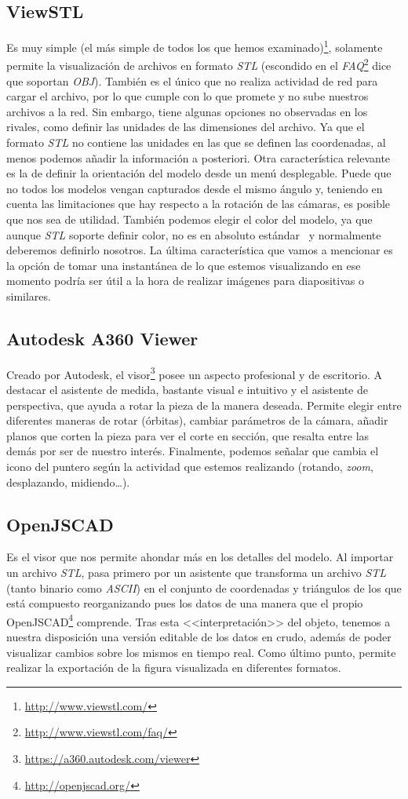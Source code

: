 \subsection{ViewSTL}
Es muy simple (el más simple de todos los que hemos examinado)\footnote{\url{http://www.viewstl.com/}}, solamente permite la visualización de archivos en formato \textit{STL} (escondido en el \textit{FAQ}\footnote{\url{http://www.viewstl.com/faq/}} dice que soportan \textit{OBJ}). También es el único que no realiza actividad de red para cargar el archivo, por lo que cumple con lo que promete y no sube nuestros archivos a la red.
Sin embargo, tiene algunas opciones no observadas en los rivales, como definir las unidades de las dimensiones del archivo. Ya que el formato \textit{STL} no contiene las unidades en las que se definen las coordenadas, al menos podemos añadir la información a posteriori.
Otra característica relevante es la de definir la orientación del modelo desde un menú desplegable. Puede que no todos los modelos vengan capturados desde el mismo ángulo y, teniendo en cuenta las limitaciones que hay respecto a la rotación de las cámaras, es posible que nos sea de utilidad.
También podemos elegir el color del modelo, ya que aunque \textit{STL} soporte definir color, no es en absoluto estándar~\cite{wiki:color-in-STL} y normalmente deberemos definirlo nosotros.
La última característica que vamos a mencionar es la opción de tomar una instantánea de lo que estemos visualizando en ese momento podría ser útil a la hora de realizar imágenes para diapositivas o similares.

\subsection{Autodesk A360 Viewer}
Creado por Autodesk, el visor\footnote{\url{https://a360.autodesk.com/viewer}} posee un aspecto profesional y de escritorio.
A destacar el asistente de medida, bastante visual e intuitivo y el asistente de perspectiva, que ayuda a rotar la pieza de la manera deseada.
Permite elegir entre diferentes maneras de rotar (órbitas), cambiar parámetros de la cámara, añadir planos que corten la pieza para ver el corte en sección, que resalta entre las demás por ser de nuestro interés.
Finalmente, podemos señalar que cambia el icono del puntero según la actividad que estemos realizando (rotando, \textit{zoom}, desplazando, midiendo\dots).

\subsection{OpenJSCAD}
Es el visor que nos permite ahondar más en los detalles del modelo. Al importar un archivo \textit{STL}, pasa primero por un asistente que transforma un archivo \textit{STL} (tanto binario como \textit{ASCII}) en el conjunto de coordenadas y triángulos de los que está compuesto reorganizando pues los datos de una manera que el propio OpenJSCAD\footnote{\url{http://openjscad.org/}} comprende. Tras esta <<interpretación>> del objeto, tenemos a nuestra disposición una versión editable de los datos en crudo, además de poder visualizar cambios sobre los mismos en tiempo real.
Como último punto, permite realizar la exportación de la figura visualizada en diferentes formatos.



